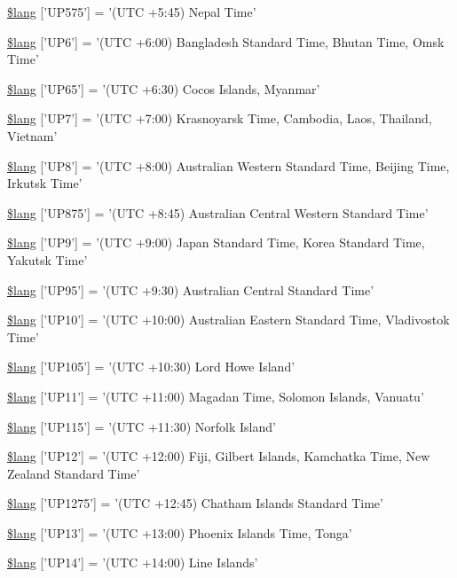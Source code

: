 \begin{DoxyCompactItemize}
\hyperlink{date__lang_8php_abc4186fc3bc853aa036b5b11eeb52ecd}{\$lang} \mbox{[}'U\-P575'\mbox{]} = '(U\-T\-C +5\-:45) Nepal Time'
\item 
\hyperlink{date__lang_8php_aaa655de76a3be875d9cedbf4a57244fa}{\$lang} \mbox{[}'U\-P6'\mbox{]} = '(U\-T\-C +6\-:00) Bangladesh Standard Time, Bhutan Time, Omsk Time'
\item 
\hyperlink{date__lang_8php_af94f885b6e6c50abdf7672ddfa80774d}{\$lang} \mbox{[}'U\-P65'\mbox{]} = '(U\-T\-C +6\-:30) Cocos Islands, Myanmar'
\item 
\hyperlink{date__lang_8php_aeedffaf1d3a16a41e881d85c420482ce}{\$lang} \mbox{[}'U\-P7'\mbox{]} = '(U\-T\-C +7\-:00) Krasnoyarsk Time, Cambodia, Laos, Thailand, Vietnam'
\item 
\hyperlink{date__lang_8php_a2a828a680158ca4cfb7fba60f35c67a3}{\$lang} \mbox{[}'U\-P8'\mbox{]} = '(U\-T\-C +8\-:00) Australian Western Standard Time, Beijing Time, Irkutsk Time'
\item 
\hyperlink{date__lang_8php_a486696d3d41c5d263a8b550903052ecb}{\$lang} \mbox{[}'U\-P875'\mbox{]} = '(U\-T\-C +8\-:45) Australian Central Western Standard Time'
\item 
\hyperlink{date__lang_8php_aa112bfd057369e5adb437c55457c9f79}{\$lang} \mbox{[}'U\-P9'\mbox{]} = '(U\-T\-C +9\-:00) Japan Standard Time, Korea Standard Time, Yakutsk Time'
\item 
\hyperlink{date__lang_8php_a96965669ac4830ab024b39a4ebb763f1}{\$lang} \mbox{[}'U\-P95'\mbox{]} = '(U\-T\-C +9\-:30) Australian Central Standard Time'
\item 
\hyperlink{date__lang_8php_ab55df5b1ac6457c16ea32f01070966f6}{\$lang} \mbox{[}'U\-P10'\mbox{]} = '(U\-T\-C +10\-:00) Australian Eastern Standard Time, Vladivostok Time'
\item 
\hyperlink{date__lang_8php_aeb674ae9d76fd6d0d9c9e77ed5a212e9}{\$lang} \mbox{[}'U\-P105'\mbox{]} = '(U\-T\-C +10\-:30) Lord Howe Island'
\item 
\hyperlink{date__lang_8php_a463ad4d63523352c17685f734b4ec7cc}{\$lang} \mbox{[}'U\-P11'\mbox{]} = '(U\-T\-C +11\-:00) Magadan Time, Solomon Islands, Vanuatu'
\item 
\hyperlink{date__lang_8php_a46fa8957c8e606d1641bbcdd75cd2df0}{\$lang} \mbox{[}'U\-P115'\mbox{]} = '(U\-T\-C +11\-:30) Norfolk Island'
\item 
\hyperlink{date__lang_8php_a18a8bb072c3fe7db99091538ce5168be}{\$lang} \mbox{[}'U\-P12'\mbox{]} = '(U\-T\-C +12\-:00) Fiji, Gilbert Islands, Kamchatka Time, New Zealand Standard Time'
\item 
\hyperlink{date__lang_8php_a92e3c23bd9d963bbdfd21e39521bfdc1}{\$lang} \mbox{[}'U\-P1275'\mbox{]} = '(U\-T\-C +12\-:45) Chatham Islands Standard Time'
\item 
\hyperlink{date__lang_8php_ac197fec09ff547ca12a7fe3ffc5908ae}{\$lang} \mbox{[}'U\-P13'\mbox{]} = '(U\-T\-C +13\-:00) Phoenix Islands Time, Tonga'
\item 
\hyperlink{date__lang_8php_a50562230c497ebdba1f540d409110fce}{\$lang} \mbox{[}'U\-P14'\mbox{]} = '(U\-T\-C +14\-:00) Line Islands'
\end{DoxyCompactItemize}


